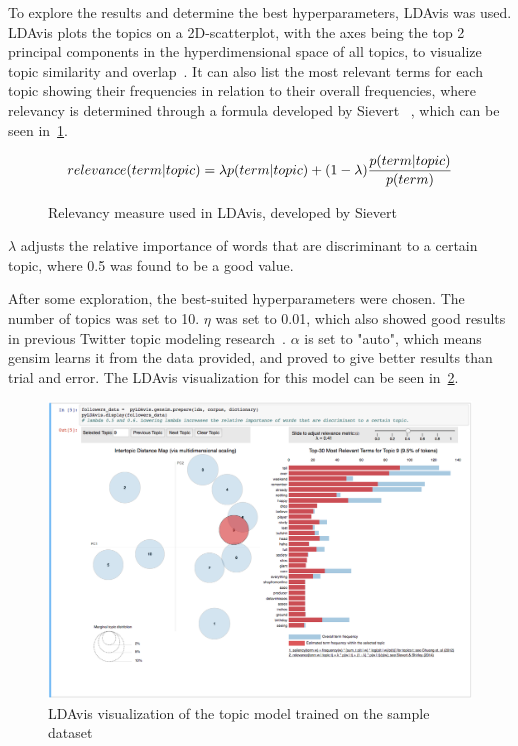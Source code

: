 To explore the results and determine the best hyperparameters, LDAvis was used.
LDAvis plots the topics on a 2D-scatterplot, with the axes being the top 2 principal components
in the hyperdimensional space of all topics, to visualize topic similarity and overlap~\cite{ldavis}.
It can also list the most relevant terms for each topic showing their frequencies in relation to their overall frequencies,
where relevancy is determined through a formula developed by Sievert \etAl~\cite{sievert2014ldavis},
which can be seen in~\cref{math:relevance}.

\begin{figure}
    \caption{Relevancy measure used in LDAvis, developed by Sievert \etAl~\cite{sievert2014ldavis}}
    \label{math:relevance}
    \begin{align*}
        relevance(term | topic) = \lambda \* p(term | topic) + (1 - \lambda) \* \frac{p(term | topic)}{p(term)}
    \end{align*}
\end{figure}

$\lambda$ adjusts the relative importance of words that are discriminant to a certain topic,
where 0.5 was found to be a good value.

After some exploration, the best-suited hyperparameters were chosen.
The number of topics was set to 10.
$\eta$ was set to 0.01, which also showed good results in previous Twitter topic modeling research~\cite{Hong2010}.
$\alpha$ is set to "auto", which means gensim learns it from the data provided, and proved to give better results than trial and error.
The LDAvis visualization for this model can be seen in~\cref{fig:ldavis}.

\begin{figure}
    \centering
    \caption{LDAvis visualization of the topic model trained on the sample dataset}
    \label{fig:ldavis}
    \includegraphics[width=\textwidth]{../images/LDAvis.png}
\end{figure}

